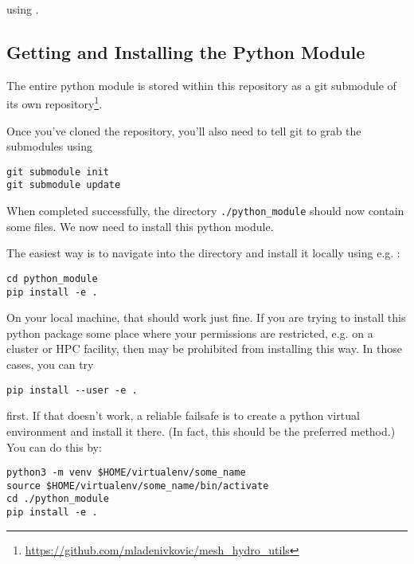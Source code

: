 using .








\subsection{Getting and Installing the Python Module}\label{chap:py}


The entire \mhutils python module is stored within this repository as a git
submodule of its own
repository\footnote{\url{https://github.com/mladenivkovic/mesh_hydro_utils}}.

Once you've cloned the \hydro repository, you'll also need to tell git to grab
the submodules using

\begin{lstlisting}
git submodule init
git submodule update
\end{lstlisting}

When completed successfully, the directory \verb|./python_module| should now
contain some files. We now need to install this python module.

The easiest way is to navigate into the directory and install it locally using
e.g. :

\begin{lstlisting}
cd python_module
pip install -e .
\end{lstlisting}

On your local machine, that should work just fine. If you are trying to install
this python package some place where your permissions are restricted, e.g. on a
cluster or HPC facility, then  may be prohibited from installing this
way. In those cases, you can try

\begin{lstlisting}
pip install --user -e .
\end{lstlisting}

first. If that doesn't work, a reliable failsafe is to create a python virtual
environment and install it there. (In fact, this should be the preferred
method.) You can do this by:

\begin{lstlisting}
python3 -m venv $HOME/virtualenv/some_name
source $HOME/virtualenv/some_name/bin/activate
cd ./python_module
pip install -e .
\end{lstlisting}

